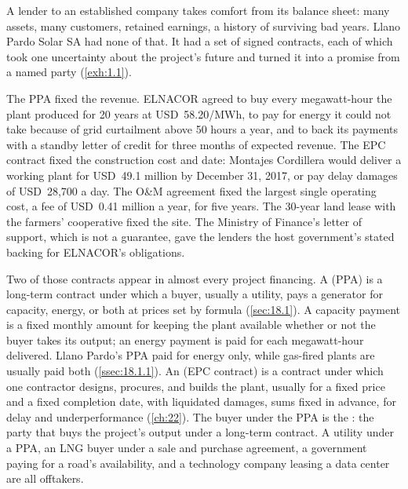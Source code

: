 A lender to an established company takes comfort from its balance sheet: many assets, many customers, retained earnings, a history of surviving bad years. Llano Pardo Solar SA had none of that. It had a set of signed contracts, each of which took one uncertainty about the project's future and turned it into a promise from a named party (\cref{exh:1.1}).

The PPA fixed the revenue. ELNACOR agreed to buy every megawatt-hour the plant produced for 20 years at USD~58.20/MWh, to pay for energy it could not take because of grid curtailment above 50 hours a year, and to back its payments with a standby letter of credit for three months of expected revenue. The EPC contract fixed the construction cost and date: Montajes Cordillera would deliver a working plant for USD~49.1 million by December 31, 2017, or pay delay damages of USD~28,700 a day. The O\&M agreement fixed the largest single operating cost, a fee of USD~0.41 million a year, for five years. The 30-year land lease with the farmers' cooperative fixed the site. The Ministry of Finance's letter of support, which is not a guarantee, gave the lenders the host government's stated backing for ELNACOR's obligations.

Two of those contracts appear in almost every project financing. A  (PPA) is a long-term contract under which a buyer, usually a utility, pays a generator for capacity, energy, or both at prices set by formula (\cref{sec:18.1}). A capacity payment is a fixed monthly amount for keeping the plant available whether or not the buyer takes its output; an energy payment is paid for each megawatt-hour delivered. Llano Pardo's PPA paid for energy only, while gas-fired plants are usually paid both (\cref{ssec:18.1.1}). An  (EPC contract) is a contract under which one contractor designs, procures, and builds the plant, usually for a fixed price and a fixed completion date, with liquidated damages, sums fixed in advance, for delay and underperformance (\cref{ch:22}). The buyer under the PPA is the : the party that buys the project's output under a long-term contract. A utility under a PPA, an LNG buyer under a sale and purchase agreement, a government paying for a road's availability, and a technology company leasing a data center are all offtakers.


